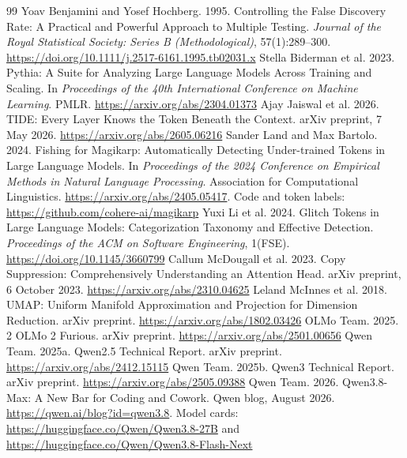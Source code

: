 \documentclass[11pt]{article}
\begin{document}
\begin{thebibliography}{99}
 Yoav Benjamini and Yosef Hochberg. 1995. Controlling the False Discovery Rate: A Practical and Powerful Approach to Multiple Testing. \emph{Journal of the Royal Statistical Society: Series B (Methodological)}, 57(1):289--300. \url{https://doi.org/10.1111/j.2517-6161.1995.tb02031.x}
 Stella Biderman et al. 2023. Pythia: A Suite for Analyzing Large Language Models Across Training and Scaling. In \emph{Proceedings of the 40th International Conference on Machine Learning}. PMLR. \url{https://arxiv.org/abs/2304.01373}
 Ajay Jaiswal et al. 2026. TIDE: Every Layer Knows the Token Beneath the Context. arXiv preprint, 7 May 2026. \url{https://arxiv.org/abs/2605.06216}
 Sander Land and Max Bartolo. 2024. Fishing for Magikarp: Automatically Detecting Under-trained Tokens in Large Language Models. In \emph{Proceedings of the 2024 Conference on Empirical Methods in Natural Language Processing}. Association for Computational Linguistics. \url{https://arxiv.org/abs/2405.05417}. Code and token labels: \url{https://github.com/cohere-ai/magikarp}
 Yuxi Li et al. 2024. Glitch Tokens in Large Language Models: Categorization Taxonomy and Effective Detection. \emph{Proceedings of the ACM on Software Engineering}, 1(FSE). \url{https://doi.org/10.1145/3660799}
 Callum McDougall et al. 2023. Copy Suppression: Comprehensively Understanding an Attention Head. arXiv preprint, 6 October 2023. \url{https://arxiv.org/abs/2310.04625}
 Leland McInnes et al. 2018. UMAP: Uniform Manifold Approximation and Projection for Dimension Reduction. arXiv preprint. \url{https://arxiv.org/abs/1802.03426}
 OLMo Team. 2025. 2 OLMo 2 Furious. arXiv preprint. \url{https://arxiv.org/abs/2501.00656}
 Qwen Team. 2025a. Qwen2.5 Technical Report. arXiv preprint. \url{https://arxiv.org/abs/2412.15115}
 Qwen Team. 2025b. Qwen3 Technical Report. arXiv preprint. \url{https://arxiv.org/abs/2505.09388}
 Qwen Team. 2026. Qwen3.8-Max: A New Bar for Coding and Cowork. Qwen blog, August 2026. \url{https://qwen.ai/blog?id=qwen3.8}. Model cards: \url{https://huggingface.co/Qwen/Qwen3.8-27B} and \url{https://huggingface.co/Qwen/Qwen3.8-Flash-Next}

\end{thebibliography}
\end{document}
